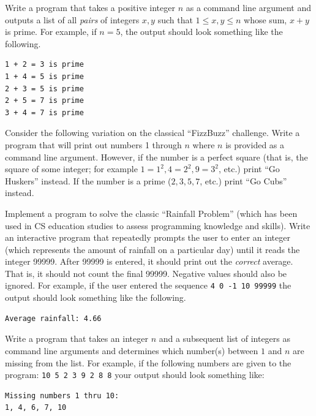 \begin{exer}
Write a program that takes a positive integer $n$ as a command line argument
and outputs a list
of all \emph{pairs} of integers $x, y$ such that $1 \leq x, y \leq n$ whose sum,
$x + y$ is prime.  For example, if $n = 5$, the output should look something like
the following.

\begin{verbatim}
1 + 2 = 3 is prime
1 + 4 = 5 is prime
2 + 3 = 5 is prime
2 + 5 = 7 is prime
3 + 4 = 7 is prime
\end{verbatim}
\end{exer}

\begin{exer}
Consider the following variation on the classical ``FizzBuzz'' challenge.
Write a program that will print out numbers 1 through $n$ where $n$ is provided
as a command line argument.  However, if the number is a perfect square 
(that is, the square of some integer; for example $1 = 1^2, 4 = 2^2, 9 = 3^2$, etc.) 
print ``Go Huskers'' instead.  If the number is a prime
($2, 3, 5, 7$, etc.) print ``Go Cubs'' instead.
\end{exer}

\begin{exer}
Implement a program to solve the classic ``Rainfall Problem''
(which has been used in CS education studies to assess programming knowledge
and skills).  Write an interactive program that repeatedly prompts the user to enter
an integer (which represents the amount of rainfall on a particular day) 
until it reads the integer 99999.  After 99999 is entered, it should print 
out the \emph{correct} average.  That is, it should not count the final 99999.
Negative values should also be ignored.  For example, if the user entered
the sequence \texttt{4 0 -1 10 99999} the output should look something
like the following.

\begin{verbatim}
Average rainfall: 4.66
\end{verbatim}
\end{exer}

\begin{exer}
Write a program that takes an integer $n$ and a subsequent list
of integers as command line arguments and determines which number(s) 
between $1$ and $n$ are missing from the list.  For example, if the following
numbers are given to the program:
  \texttt{10 5 2 3 9 2 8 8}
your output should look something like:

\begin{verbatim}
Missing numbers 1 thru 10:
1, 4, 6, 7, 10
\end{verbatim}
\end{exer}

